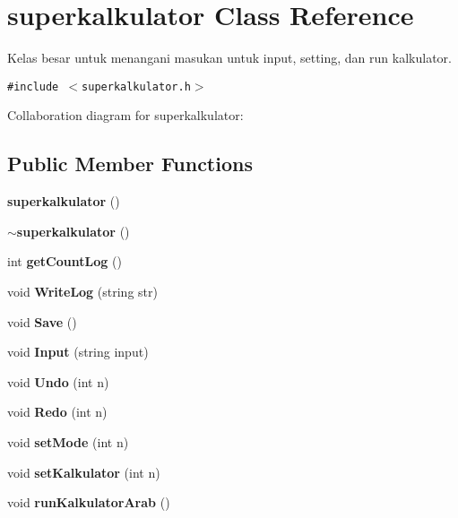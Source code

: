 \section{superkalkulator Class Reference}
\label{classsuperkalkulator}
Kelas besar untuk menangani masukan untuk input, setting, dan run kalkulator.  


{\tt \#include $<$superkalkulator.h$>$}

Collaboration diagram for superkalkulator:\subsection*{Public Member Functions}
\begin{CompactItemize}
\item 
{\bf superkalkulator} ()\label{classsuperkalkulator_0fee8ac5eb224c42468afa01baad748d}

\item 
{\bf $\sim$superkalkulator} ()\label{classsuperkalkulator_2aa376ad698b7b4f7f133b3998a07fff}

\item 
int {\bf get\-Count\-Log} ()\label{classsuperkalkulator_d8082e61fc70a9af6a208024f594afd9}

\item 
void {\bf Write\-Log} (string str)\label{classsuperkalkulator_a6386fb73a3f1a5f56603b094fb66c94}

\item 
void {\bf Save} ()\label{classsuperkalkulator_3b751a81a072f0baa5e85f7f43c27320}

\item 
void {\bf Input} (string input)\label{classsuperkalkulator_06d3c0bf8c4bf8e34c0b8faab70e6cda}

\item 
void {\bf Undo} (int n)\label{classsuperkalkulator_61b2d9f0ba56dac42e4458eade4602bc}

\item 
void {\bf Redo} (int n)\label{classsuperkalkulator_a039cd5a5c7e686e5e542a669a897ba3}

\item 
void {\bf set\-Mode} (int n)\label{classsuperkalkulator_303071f52879a615848823e8ad8c1549}

\item 
void {\bf set\-Kalkulator} (int n)\label{classsuperkalkulator_fc49bc2a8f03da410c24c01101144c2b}

\item 
void {\bf run\-Kalkulator\-Arab} ()\label{classsuperkalkulator_5130ad9cbe82a8fd21d36465f7cc9538}


\end{CompactItemize}
